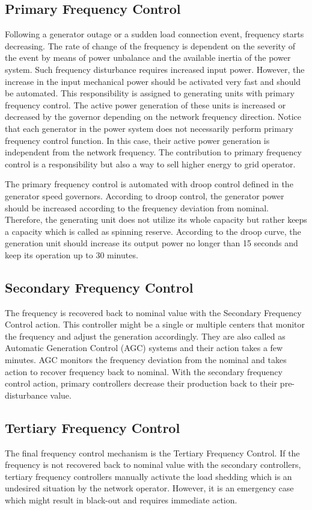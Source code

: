 \subsection{Primary Frequency Control}
Following a generator outage or a sudden load connection event, frequency starts decreasing. The rate of change of the frequency is dependent on the severity of the event by means of power unbalance and the available inertia of the power system. Such frequency disturbance requires increased input power. However, the increase in the input mechanical power should be activated very fast and should be automated. This responsibility is assigned to generating units with primary frequency control. The active power generation of these units is increased or decreased by the governor depending on the network frequency direction. Notice that each generator in the power system does not necessarily perform primary frequency control function. In this case, their active power generation is independent from the network frequency. The contribution to primary frequency control is a responsibility but also a way to sell higher energy to grid operator.\par
The primary frequency control is automated with droop control defined in the generator speed governors. According to droop control, the generator power should be increased according to the frequency deviation from nominal. Therefore, the generating unit does not utilize its whole capacity but rather keeps a capacity which is called as spinning reserve. According to the droop curve, the generation unit should increase its output power no longer than 15 seconds and keep its operation up to 30 minutes\cite{Machowski2011}.
\subsection{Secondary Frequency Control}
The frequency is recovered back to nominal value with the Secondary Frequency Control action. This controller might be a single or multiple centers that monitor the frequency and adjust the generation accordingly. They are also called as Automatic Generation Control (AGC) systems and their action takes a few minutes. AGC monitors the frequency deviation from the nominal and takes action to recover frequency back to nominal. With the secondary frequency control action, primary controllers decrease their production back to their pre-disturbance value.
\subsection{Tertiary Frequency Control}
The final frequency control mechanism is the Tertiary Frequency Control. If the frequency is not recovered back to nominal value with the secondary controllers, tertiary frequency controllers manually activate the load shedding which is an undesired situation by the network operator. However, it is an emergency case which might result in black-out and requires immediate action.
